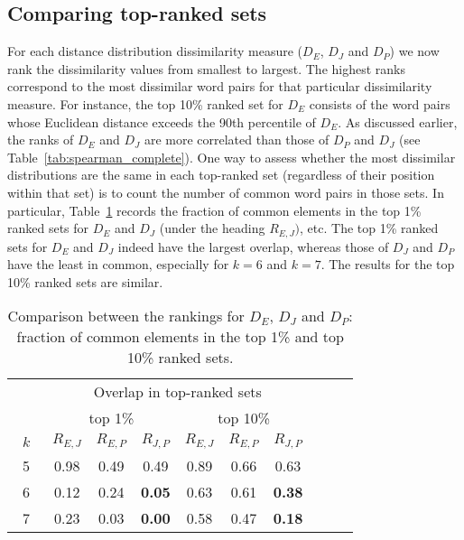 \documentclass[review,12pt]{elsarticle}
\begin{document}
\subsection{Comparing top-ranked sets}
For each distance distribution dissimilarity
measure ($D_E$, $D_J$ and $D_P$) we now
rank the dissimilarity values from smallest
to largest.
The highest ranks correspond to the most
dissimilar word pairs for that particular
dissimilarity measure. For instance, the
top 10\% ranked set for $D_E$ consists of
the word pairs whose Euclidean distance
exceeds the 90th percentile of $D_E$.
As discussed earlier, the ranks of $D_E$ and
$D_J$ are more correlated than those of $D_P$
and $D_J$ (see
Table~\ref{tab:spearman_complete}).
One way to assess whether the most dissimilar
distributions are the same in each top-ranked
set (regardless of their position within
that set) is to count the number of common
word pairs in those sets.
In particular, Table~\ref{tab:ranks} records
the fraction of common elements in the top
1\% ranked sets for $D_E$ and $D_J$ (under
the heading $R_{E,J})$, etc.
The top 1\% ranked sets for $D_E$ and $D_J$
indeed have the largest overlap, whereas
those of $D_J$ and $D_P$ have the least in
common, especially for $k = 6$ and $k = 7$.
The results for the top 10\% ranked sets are
similar.

\begin{table}[htbp]
\centering
\scriptsize
\caption{Comparison between the
rankings for $D_E$, $D_J$ and $D_P$: fraction
of common elements in the top 1\% and top 10\%
ranked sets.}
\renewcommand{\arraystretch}{1.2}
\setlength\tabcolsep{2.5pt}
\begin{tabular}{|c|ccc|ccc|ccc|}
\hline
  \multicolumn{1}{|c|}{} &
	\multicolumn{6}{|c|}{Overlap in top-ranked sets} \\
\cline{2-7}	
  \multicolumn{1}{|c|}{} &
	\multicolumn{3}{|c|}{top 1\%} &
	\multicolumn{3}{|c|}{top 10\%}  \\
\hline
  $\;\;k\;\;$ &
	$R_{E,J}$ & $R_{E,P}$ & $R_{J,P}$ &
  $R_{E,J}$ & $R_{E,P}$ & $R_{J,P}$ \\
\hline
  5 & 0.98 & 0.49 & 0.49 & 0.89 & 0.66 & 0.63 \\
  6 & 0.12 & 0.24 & \bf{0.05} & 0.63 & 0.61 & \bf{0.38}  \\
  7 & 0.23 & 0.03 & \bf{0.00} & 0.58 & 0.47 & \bf{0.18}  \\
\hline
\end{tabular}
\label{tab:ranks}
\end{table}
\end{document}
